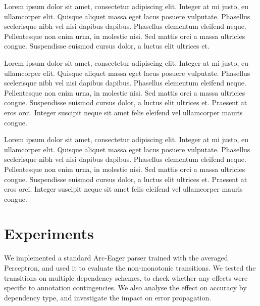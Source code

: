 \documentclass[11pt,letterpaper]{article}
\begin{document}
Lorem ipsum dolor sit amet, consectetur adipiscing elit. Integer at mi justo, eu ullamcorper elit. Quisque aliquet massa eget lacus posuere vulputate. Phasellus scelerisque nibh vel nisi dapibus dapibus. Phasellus elementum eleifend neque. Pellentesque non enim urna, in molestie nisi. Sed mattis orci a massa ultricies congue. Suspendisse euismod cursus dolor, a luctus elit ultrices et.

Lorem ipsum dolor sit amet, consectetur adipiscing elit. Integer at mi justo, eu ullamcorper elit. Quisque aliquet massa eget lacus posuere vulputate. Phasellus scelerisque nibh vel nisi dapibus dapibus. Phasellus elementum eleifend neque. Pellentesque non enim urna, in molestie nisi. Sed mattis orci a massa ultricies congue. Suspendisse euismod cursus dolor, a luctus elit ultrices et. Praesent at eros orci. Integer suscipit neque sit amet felis eleifend vel ullamcorper mauris congue.

Lorem ipsum dolor sit amet, consectetur adipiscing elit. Integer at mi justo, eu ullamcorper elit. Quisque aliquet massa eget lacus posuere vulputate. Phasellus scelerisque nibh vel nisi dapibus dapibus. Phasellus elementum eleifend neque. Pellentesque non enim urna, in molestie nisi. Sed mattis orci a massa ultricies congue. Suspendisse euismod cursus dolor, a luctus elit ultrices et. Praesent at eros orci. Integer suscipit neque sit amet felis eleifend vel ullamcorper mauris congue.
\section{Experiments}

We implemented a standard Arc-Eager parser trained with the averaged Perceptron,
and used it to evaluate the non-monotonic transitions. We tested the transitions on
multiple dependency schemes, to check whether any effects were specific to annotation
contingencies. We also analyse the effect on accuracy by dependency type, and
investigate the impact on error propagation.
\end{document}
